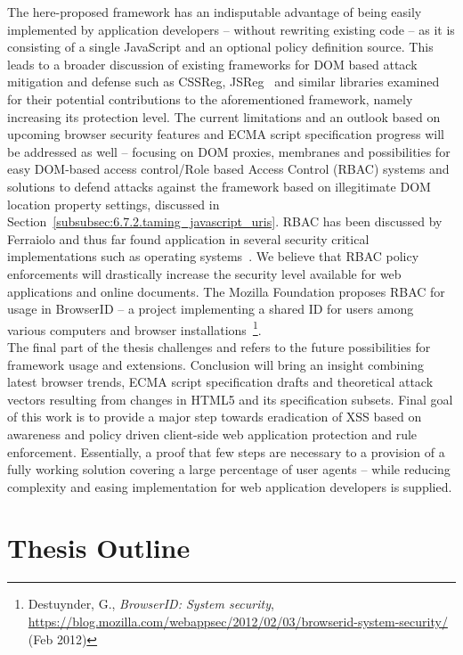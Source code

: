   The here-proposed framework has an indisputable advantage of being easily implemented by application developers -- without rewriting existing code -- as it is consisting of a single JavaScript and an optional policy definition source. This leads to a broader discussion of existing frameworks for DOM based attack mitigation and defense such as CSSReg, JSReg~\cite{heyes_jsreg_2011} and similar libraries examined for their potential contributions to the aforementioned framework, namely increasing its protection level. The current limitations and an outlook based on upcoming browser security features and ECMA script specification progress will be addressed as well -- focusing on DOM proxies, membranes and possibilities for easy DOM-based access control/Role based Access Control (RBAC) systems and solutions to defend attacks against the framework based on illegitimate DOM location property settings, discussed in Section~\ref{subsubsec:6.7.2.taming_javascript_uris}. RBAC has been discussed by Ferraiolo and thus far found application in several security critical implementations such as operating systems~\cite{ferraiolo1995role}. We believe that RBAC policy enforcements will drastically increase the security level available for web applications and online documents. The Mozilla Foundation proposes RBAC for usage in BrowserID -- a project implementing a shared ID for users among various computers and browser installations~\footnote{Destuynder, G., \textit{BrowserID: System security}, \url{https://blog.mozilla.com/webappsec/2012/02/03/browserid-system-security/} (Feb 2012)}.\\

  The final part of the thesis challenges and refers to the future possibilities for framework usage and extensions. Conclusion will bring  an insight combining latest browser trends, ECMA script specification drafts and theoretical attack vectors resulting from changes in HTML5 and its
 specification subsets. Final goal of this work is to provide a major step towards eradication of XSS based on awareness and policy driven client-side web application protection and rule enforcement. Essentially, a proof that few steps are necessary to a provision of a fully working solution covering a large percentage of user agents -- while reducing complexity and easing implementation for web application developers is supplied. \\

  \section{Thesis Outline}
  \label{subsec:1.1.thesis_overview}

